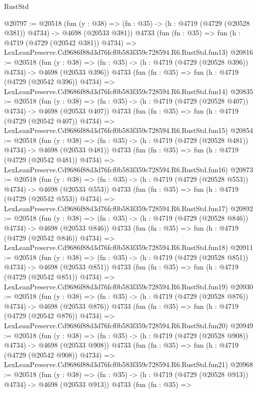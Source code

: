 \begin{lexlean}{RustStd}
\begin{coremodule}
@20797 := @20518
    (fun (y : @38) => (fn : @35) -> (h : @4719 (@4729 (@20528 @381)) @4734) -> @4698 (@20533 @381))
    @4733
    (fun (fn : @35) =>
    fun (h : @4719 (@4729 (@20542 @381)) @4734) =>
    LexLeanPreserve.Cd9686f88d3d76fcf0b583f359c728594.R6.RustStd.fun13)
@20816 := @20518
    (fun (y : @38) => (fn : @35) -> (h : @4719 (@4729 (@20528 @396)) @4734) -> @4698 (@20533 @396))
    @4733
    (fun (fn : @35) =>
    fun (h : @4719 (@4729 (@20542 @396)) @4734) =>
    LexLeanPreserve.Cd9686f88d3d76fcf0b583f359c728594.R6.RustStd.fun14)
@20835 := @20518
    (fun (y : @38) => (fn : @35) -> (h : @4719 (@4729 (@20528 @407)) @4734) -> @4698 (@20533 @407))
    @4733
    (fun (fn : @35) =>
    fun (h : @4719 (@4729 (@20542 @407)) @4734) =>
    LexLeanPreserve.Cd9686f88d3d76fcf0b583f359c728594.R6.RustStd.fun15)
@20854 := @20518
    (fun (y : @38) => (fn : @35) -> (h : @4719 (@4729 (@20528 @481)) @4734) -> @4698 (@20533 @481))
    @4733
    (fun (fn : @35) =>
    fun (h : @4719 (@4729 (@20542 @481)) @4734) =>
    LexLeanPreserve.Cd9686f88d3d76fcf0b583f359c728594.R6.RustStd.fun16)
@20873 := @20518
    (fun (y : @38) => (fn : @35) -> (h : @4719 (@4729 (@20528 @553)) @4734) -> @4698 (@20533 @553))
    @4733
    (fun (fn : @35) =>
    fun (h : @4719 (@4729 (@20542 @553)) @4734) =>
    LexLeanPreserve.Cd9686f88d3d76fcf0b583f359c728594.R6.RustStd.fun17)
@20892 := @20518
    (fun (y : @38) => (fn : @35) -> (h : @4719 (@4729 (@20528 @846)) @4734) -> @4698 (@20533 @846))
    @4733
    (fun (fn : @35) =>
    fun (h : @4719 (@4729 (@20542 @846)) @4734) =>
    LexLeanPreserve.Cd9686f88d3d76fcf0b583f359c728594.R6.RustStd.fun18)
@20911 := @20518
    (fun (y : @38) => (fn : @35) -> (h : @4719 (@4729 (@20528 @851)) @4734) -> @4698 (@20533 @851))
    @4733
    (fun (fn : @35) =>
    fun (h : @4719 (@4729 (@20542 @851)) @4734) =>
    LexLeanPreserve.Cd9686f88d3d76fcf0b583f359c728594.R6.RustStd.fun19)
@20930 := @20518
    (fun (y : @38) => (fn : @35) -> (h : @4719 (@4729 (@20528 @876)) @4734) -> @4698 (@20533 @876))
    @4733
    (fun (fn : @35) =>
    fun (h : @4719 (@4729 (@20542 @876)) @4734) =>
    LexLeanPreserve.Cd9686f88d3d76fcf0b583f359c728594.R6.RustStd.fun20)
@20949 := @20518
    (fun (y : @38) => (fn : @35) -> (h : @4719 (@4729 (@20528 @908)) @4734) -> @4698 (@20533 @908))
    @4733
    (fun (fn : @35) =>
    fun (h : @4719 (@4729 (@20542 @908)) @4734) =>
    LexLeanPreserve.Cd9686f88d3d76fcf0b583f359c728594.R6.RustStd.fun21)
@20968 := @20518
    (fun (y : @38) => (fn : @35) -> (h : @4719 (@4729 (@20528 @913)) @4734) -> @4698 (@20533 @913))
    @4733
    (fun (fn : @35) =>

\end{coremodule}
\end{lexlean}
